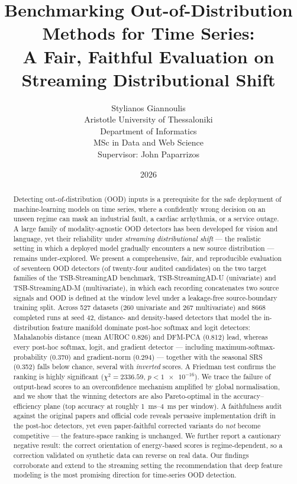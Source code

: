 \documentclass[11pt]{article}
\title{\textbf{Benchmarking Out-of-Distribution Methods for Time Series:\\
A Fair, Faithful Evaluation on Streaming Distributional Shift}}
\author{Stylianos Giannoulis\\
Aristotle University of Thessaloniki\\
Department of Informatics\\
MSc in Data and Web Science\\
Supervisor: John Paparrizos}
\date{2026}
\begin{document}
\maketitle

\begin{abstract}
Detecting out-of-distribution (OOD) inputs is a prerequisite for the safe
deployment of machine-learning models on time series, where a confidently wrong
decision on an unseen regime can mask an industrial fault, a cardiac arrhythmia,
or a service outage. A large family of modality-agnostic OOD detectors has been
developed for vision and language, yet their reliability under \emph{streaming
distributional shift} --- the realistic setting in which a deployed model
gradually encounters a new source distribution --- remains under-explored. We
present a comprehensive, fair, and reproducible evaluation of seventeen OOD
detectors (of twenty-four audited candidates) on the two target families of the
TSB-StreamingAD benchmark, TSB-StreamingAD-U (univariate) and TSB-StreamingAD-M
(multivariate), in which each recording concatenates two source signals and OOD
is defined at the window level under a leakage-free source-boundary training
split. Across \num{527} datasets (\num{260} univariate and \num{267}
multivariate) and \num{8668} completed runs at seed \num{42}, distance- and
density-based detectors that model the in-distribution feature manifold dominate
post-hoc softmax and logit detectors: Mahalanobis distance (mean AUROC
\num{0.826}) and DFM-PCA (\num{0.812}) lead, whereas every post-hoc softmax,
logit, and gradient detector --- including maximum-softmax-probability
(\num{0.370}) and gradient-norm (\num{0.294}) --- together with the seasonal SRS
(\num{0.352}) falls below chance, several with \emph{inverted} scores. A Friedman
test confirms the ranking is highly significant ($\chi^2 = \num{2336.59}$, $p <
\num{1e-16}$). We trace the failure of output-head scores to an overconfidence
mechanism amplified by global normalisation, and we show that the winning
detectors are also Pareto-optimal in the accuracy--efficiency plane (top accuracy
at roughly \SIrange{1}{4}{\milli\second} per window). A faithfulness audit against
the original papers and official code reveals pervasive implementation drift in
the post-hoc detectors, yet even paper-faithful corrected variants do \emph{not}
become competitive --- the feature-space ranking is unchanged. We further report a
cautionary negative result: the correct orientation of energy-based scores is
regime-dependent, so a correction validated on synthetic data can reverse on real
data. Our findings corroborate and extend to the streaming setting the
recommendation that deep feature modeling is the most promising direction for
time-series OOD detection.
\end{abstract}
\end{document}
